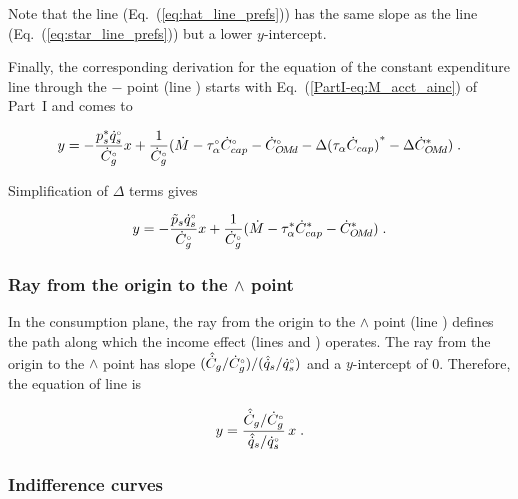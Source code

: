 Note that the \hathatline{} line (Eq.~(\ref{eq:hat_line_prefs})) has the same slope as 
the \starstar{} line (Eq.~(\ref{eq:star_line_prefs}))
but a lower $y$-intercept.

Finally, the corresponding derivation
for the equation of the constant expenditure line through the 
$-$ point (line \barbarline{}) starts with Eq.~(\ref{PartI-eq:M_acct_ainc}) of Part~I 
and comes to

\begin{equation} 
  y = - \frac{{p}^*_s {}{\dot{q}}^{\scriptscriptstyle \circ}_s}{{}{\dot{C}}^{\scriptscriptstyle \circ}_g} x
        + \frac{1}{{}{\dot{C}}^{\scriptscriptstyle \circ}_g} (\dot{M} - {}{\tau}^{\scriptscriptstyle \circ}_\alpha {}{\dot{C}}^{\scriptscriptstyle \circ}_{cap} - {}{\dot{C}}^{\scriptscriptstyle \circ}_{O\!M\!d}
                                   - \Delta {(\tau_\alpha \dot{C}_{cap})}^* - \Delta {\dot{C}}^*_{O\!M\!d}) \; .
\end{equation}

Simplification of $\Delta$ terms gives

\begin{equation} \label{eq:bar_line_prefs}
  y = - \frac{\tilde{p}_s {}{\dot{q}}^{\scriptscriptstyle \circ}_s}{{}{\dot{C}}^{\scriptscriptstyle \circ}_g} x
        + \frac{1}{{}{\dot{C}}^{\scriptscriptstyle \circ}_g} (\dot{M} - {\tau}^*_\alpha {\dot{C}}^*_{cap} - {\dot{C}}^*_{O\!M\!d}) \; .
\end{equation}
%


\subsubsection{Ray from the origin to the $\wedge$ point} 
\label{sec:pref_graph_ray}

In the consumption plane,
the ray from the origin to the $\wedge$ point 
(line \rr{})
defines the path along which the income effect
(lines \hatd{} and \dbar{})
operates.
The ray from the origin to the $\wedge$ point
has slope $(\hat{\dot{C}}_g/{}{\dot{C}}^{\scriptscriptstyle \circ}_g) / (\hat{\dot{q}}_s/{}{\dot{q}}^{\scriptscriptstyle \circ}_s)$
and a $y$-intercept of 0.
Therefore, the equation of line \rr{} is

\begin{equation} \label{eq:ray_cons}
  y = \frac{\hat{\dot{C}}_g/{}{\dot{C}}^{\scriptscriptstyle \circ}_g}{\hat{\dot{q}}_s/{}{\dot{q}}^{\scriptscriptstyle \circ}_s} \, x \; .
\end{equation}


\subsubsection{Indifference curves} 
\label{sec:cons_graph_indifference_curves}

